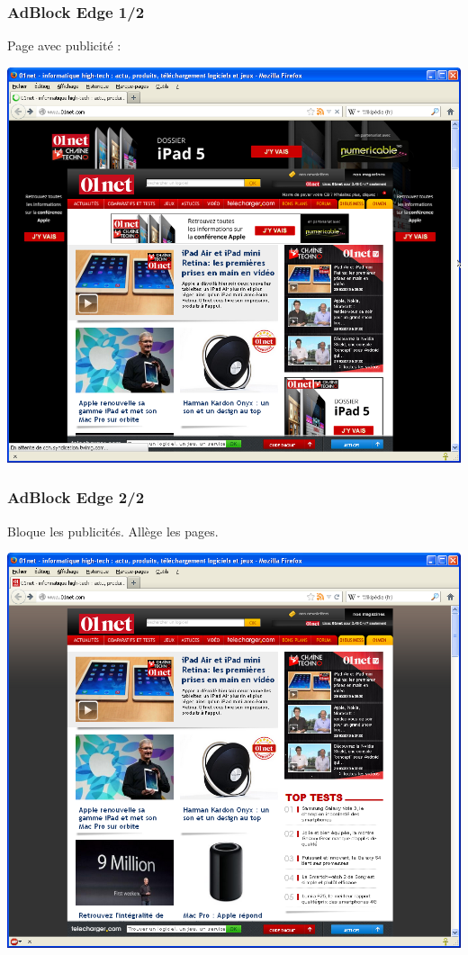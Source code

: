 \documentclass{beamer}
\begin{document}
\begin{frame}
\frametitle{AdBlock Edge 1/2}
Page avec publicité :
\begin{center}
\includegraphics[scale=0.4] {./images/Adblock01.png}
\end{center}

\end{frame}

\begin{frame}
\frametitle{AdBlock Edge 2/2}
Bloque les publicités. Allège les pages.

\begin{center}
\includegraphics[scale=0.4] {./images/Adblock02.png}
\end{center}
\end{frame}
\end{document}
